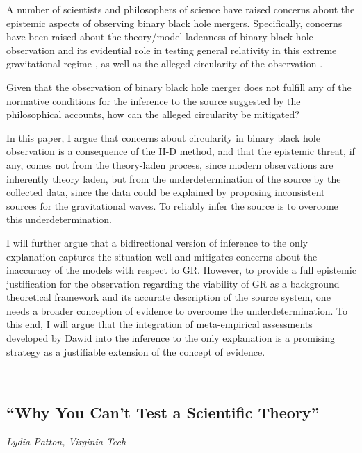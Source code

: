 \documentclass[11pt]{article}
\begin{document}
A number of scientists and philosophers of science have raised concerns about the epistemic aspects of observing binary black hole mergers. Specifically, concerns have been raised about the theory/model ladenness of binary black hole observation and its evidential role in testing general relativity in this extreme gravitational regime \cite{PhysRevD.80.122003}, as well as the alleged circularity of the observation \cite{Elder2023-ELDBHC}.

 Given that the observation of binary black hole merger does not fulfill any of the normative conditions for the inference to the source suggested by the philosophical accounts, how can the alleged circularity be mitigated?
 
In this paper, I argue that concerns about circularity in binary black hole observation is a consequence of the H-D method, and that the epistemic threat, if any, comes not from the theory-laden process, since modern observations are inherently theory laden, but from the underdetermination of the source by the collected data, since the data could be explained by proposing inconsistent sources for the gravitational waves. To reliably infer the source is to overcome this underdetermination.

I will further argue that a bidirectional version of inference to the only explanation captures the situation well and mitigates concerns about the inaccuracy of the models with respect to GR. However, to provide a full epistemic justification for the observation regarding the viability of GR as a background theoretical framework and its accurate description of the source system, one needs a broader conception of evidence to overcome the underdetermination. To this end, I will argue that the integration of meta-empirical assessments developed by Dawid \cite{Dawid2018-DAWDTU} into the inference to the only explanation is a promising strategy as a justifiable extension of the concept of evidence.

\printbibliography[heading=none]

\

\subsection*{\textsf{``Why You Can’t Test a Scientific
Theory''}}

\textcolor{moderncvgreen}{
\textit{Lydia Patton, Virginia Tech
}
}
\end{document}

